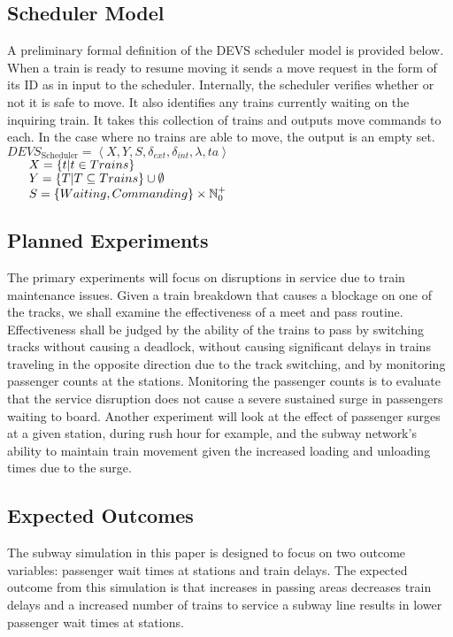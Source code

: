 \subsection{Scheduler Model}
A preliminary formal definition of the DEVS scheduler model is provided below. When a train is ready to resume moving it sends a move request in the form of its ID as in input to the scheduler.  Internally, the scheduler verifies whether or not it is safe to move.  It also identifies any trains currently waiting on the inquiring train.  It takes this collection of trains and outputs move commands to each.  In the case where no trains are able to move, the output is an empty set.
\noindent $DEVS_{\textrm{Scheduler}}=\left<X,Y,S,\delta_{ext},\delta_{int},\lambda,ta\right>$ \\
$\hspace*{4ex} X=\lbrace t|t\in Trains\rbrace$ \\
$\hspace*{4ex} Y=\lbrace T|T\subseteq Trains\rbrace \cup\emptyset$ \\
$\hspace*{4ex} S=\lbrace Waiting, Commanding\rbrace\times \mathbb{N}_0^+$ \\

\subsection{Planned Experiments}
The primary experiments will focus on disruptions in service due to train maintenance issues.  Given a train breakdown that causes a blockage on one of the tracks, we shall examine the effectiveness of a meet and pass routine.  Effectiveness shall be judged by the ability of the trains to pass by switching tracks without causing a deadlock, without causing significant delays in trains traveling in the opposite direction due to the track switching, and by monitoring passenger counts at the stations.  Monitoring the passenger counts is to evaluate that the service disruption does not cause a severe sustained surge in passengers waiting to board.  Another experiment will look at the effect of passenger surges at a given station, during rush hour for example, and the subway network's ability to maintain train movement given the increased loading and unloading times due to the surge.

\subsection{Expected Outcomes}

The subway simulation in this paper is designed to focus on two outcome variables: passenger wait times at stations and train delays. The expected outcome from this simulation is that increases in passing areas decreases train delays and a increased number of trains to service a subway line results in lower passenger wait times at stations.